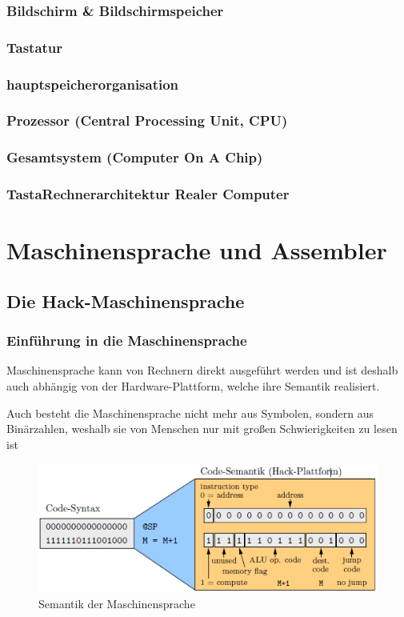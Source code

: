 \documentclass[12pt]{report}
\begin{document}
\subsection{Bildschirm \& Bildschirmspeicher}
\subsection{Tastatur}
\subsection{hauptspeicherorganisation}
\subsection{Prozessor (Central Processing Unit, CPU)}
\subsection{Gesamtsystem (Computer On A Chip)}
\subsection{TastaRechnerarchitektur Realer Computer}



\chapter{Maschinensprache und Assembler}

\section{Die Hack-Maschinensprache}
\subsection{Einführung in die Maschinensprache}
\begin{defbox}[Maschinensprache]
  Maschinensprache kann von Rechnern direkt ausgeführt werden und ist deshalb auch abhängig von der
  Hardware-Plattform, welche ihre Semantik realisiert.
  
  Auch besteht die Maschinensprache nicht mehr aus Symbolen, sondern aus Binärzahlen, weshalb sie von Menschen
  nur mit großen Schwierigkeiten zu lesen ist
\end{defbox}
\begin{figure}[H]
  \caption{Semantik der Maschinensprache}
  \label{fig:semantik_maschinensprache}
  \centering
  \includegraphics{semantik_maschinensprache}
\end{figure}
\end{document}
